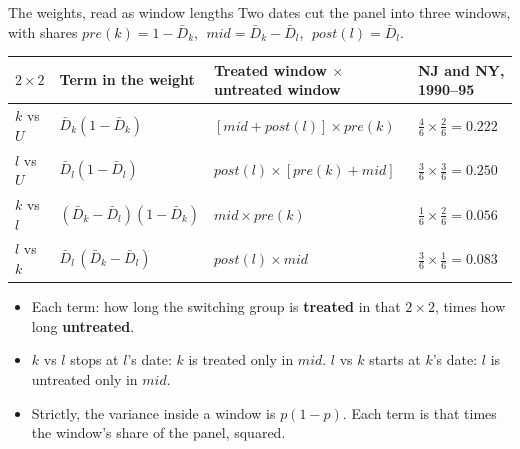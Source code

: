 \documentclass[
  11pt,
  ignorenonframetext,
  aspectratio=169,
]{beamer}
\providecommand{\tightlist}{%
  \setlength{\itemsep}{0pt}\setlength{\parskip}{0pt}}
\begin{document}
\begin{frame}{The weights, read as window lengths}
\protect{}\label{the-weights-read-as-window-lengths}
Two dates cut the panel into three windows, with shares
\(pre(k) = 1 - \bar D_k\), \(\;mid = \bar D_k - \bar D_l\),
\(\;post(l) = \bar D_l\).

\begin{center}\small
\begin{tabular}{llll}
\toprule
$2 \times 2$ & Term in the weight & Treated window $\times$ untreated window & NJ and NY, 1990--95 \\
\midrule
$k$ vs $U$ & $\bar D_k(1 - \bar D_k)$ & $[mid + post(l)] \times pre(k)$ & $\tfrac46 \times \tfrac26 = 0.222$ \\[2pt]
$l$ vs $U$ & $\bar D_l(1 - \bar D_l)$ & $post(l) \times [pre(k) + mid]$ & $\tfrac36 \times \tfrac36 = 0.250$ \\[2pt]
$k$ vs $l$ & $(\bar D_k - \bar D_l)(1 - \bar D_k)$ & $mid \times pre(k)$ & $\tfrac16 \times \tfrac26 = 0.056$ \\[2pt]
$l$ vs $k$ & $\bar D_l\,(\bar D_k - \bar D_l)$ & $post(l) \times mid$ & $\tfrac36 \times \tfrac16 = 0.083$ \\
\bottomrule
\end{tabular}
\end{center}

\begin{itemize}
\tightlist
\item
  Each term: how long the switching group is \textbf{treated} in that
  \(2 \times 2\), times how long \textbf{untreated}.
\item
  \(k\) vs \(l\) stops at \(l\)'s date: \(k\) is treated only in
  \(mid\). \(l\) vs \(k\) starts at \(k\)'s date: \(l\) is untreated
  only in \(mid\).
\item
  Strictly, the variance inside a window is \(p(1-p)\). Each term is
  that times the window's share of the panel, squared.
\end{itemize}
\end{frame}
\end{document}
